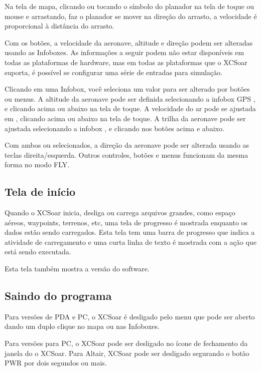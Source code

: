 Na tela de mapa, clicando ou tocando o símbolo do planador na tela de toque ou mouse e arrastando, faz o planador se mover na direção do arrasto, a velocidade é proporcional à distância do arrasto.

Com os botões, a velocidade da aeronave, altitude e direção podem ser alteradas usando as Infoboxes.  As informações a seguir podem não estar disponíveis em todas as plataformas de hardware, mas em todas as plataformas que o XCSoar suporta, é possível se configurar uma série de entradas para simulação.

Clicando em uma Infobox, você seleciona um valor para ser alterado por botões ou menus.
A altitude da aeronave pode ser definida selecionando a infobox GPS , e clicando acima ou abaixo na tela de toque.  A velocidade do ar pode se ajustada em , clicando acima ou abaixo na tela de toque.  A trilha da aeronave pode ser ajustada selecionando a infobox , e clicando nos botões acima e abaixo.

Com ambos  ou 
selecionados, a direção da aeronave pode ser alterada usando as teclas direita/esquerda.
Outros controles, botões e menus funcionam da mesma forma no modo FLY.


\subsection*{Tela de início}
Quando o XCSoar inicia, desliga ou carrega arquivos grandes, como espaço aéreos, waypoints, terrenos, etc, uma tela de progresso é mostrada enquanto os dados estão sendo carregados.  Esta tela tem uma barra de progresso que indica a atividade de carregamento e uma curta linha de texto é mostrada com a ação que está sendo executada.

Esta tela também mostra a versão do software.

\subsection*{Saindo do programa}
Para versões de PDA e PC, o XCSoar é desligado pelo menu que  pode ser aberto dando um duplo clique no mapa ou nas Infoboxes.
\begin{quote}
\end{quote}

Para versões para PC, o XCSoar pode ser desligado no ícone de fechamento da janela do o XCSoar.
Para Altair, XCSoar pode ser desligado segurando o botão PWR por dois segundos ou mais. 

